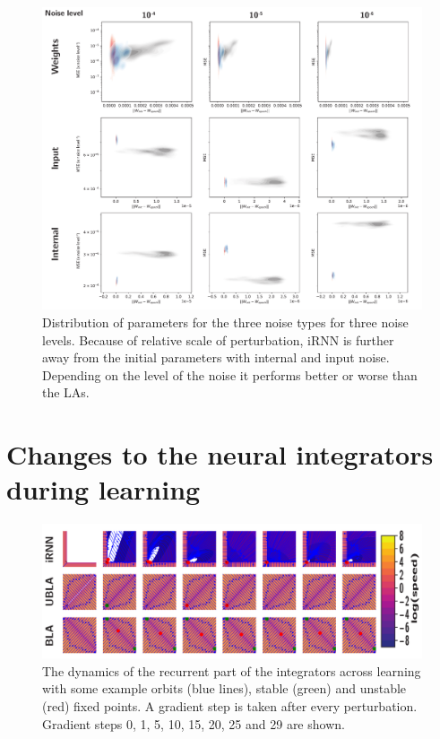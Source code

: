 \documentclass{article} %
\newcounter{ct}
\theoremstyle{definition}
\theoremstyle{remark}
\begin{document}
\begin{figure}[H]
     \centering
    \includegraphics[width=\textwidth]{allnoise_contours}
       \caption{Distribution of parameters for the three noise types for three noise levels. Because of relative scale of perturbation, iRNN is further away from the initial parameters with internal and input noise.
        Depending on the level of the noise it performs better or worse than the LAs.}
         \label{fig:interal_input_contours}
\end{figure}



\section{Changes to the neural integrators during learning}\label{sec:supp:learning}

\begin{figure}[H]
     \centering
    \includegraphics[width=\textwidth]{vfs_f100_gs1_optlrs}
       \caption{The dynamics of the recurrent part of the integrators across learning with some example orbits (blue lines), stable (green) and unstable (red) fixed points. A gradient step is taken after every perturbation. Gradient steps 0, 1, 5, 10, 15, 20, 25 and 29 are shown. }
         \label{fig:vfs1}
\end{figure}
\end{document}
